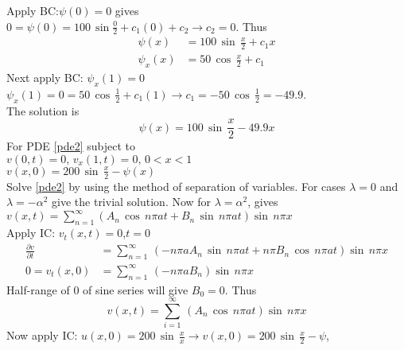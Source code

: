 Apply BC:$\psi(0)=0$ gives\\
$0=\psi(0)=100\,\sin\frac{0}{2}+c_1(0)+c_2\to c_2=0$. Thus
\begin{align}
\psi(x)&=100\,\sin\,\frac{x}{2}+c_1x\label{psi2}\\
\psi_x(x)&=50\,\cos\,\frac{x}{2}+c_1\label{psi3}
\end{align}
Next apply BC:  $\psi_x(1)=0$\\
  $\psi_x(1)=0=50\,\cos\,\frac{1}{2}+c_1(1)\to c_1=-50\,\cos\,\frac{1}{2}=-49.9$.\\
The solution is
\begin{equation}
\psi(x)=100\,\sin\,\frac{x}{2}-49.9x
\end{equation}
For PDE \eqref{pde2} subject to\\
$v(0,t)=0,\,v_x(1,t)=0,\,0<x<1$\\
$v(x,0)=200\,\sin\,\frac{x}{2}-\psi(x)$\\
Solve \eqref{pde2} by using the method of separation of variables. For cases $\lambda=0$ and $\lambda=-\alpha^2$ give the trivial solution. Now for $\lambda=\alpha^2$, gives\\
$v(x,t)=\sum_{n=1}^\infty\left(A_n\,\cos\,n\pi a t+B_n\,\sin\,n\pi a t\right)\sin\,n\pi x\label{s2}$\\
Apply IC: $v_t(x,t)=0$,$t=0$
\begin{align*}
\frac{\partial v}{\partial t}&=\sum_{n=1}^\infty\,(-n\pi aA_n\,\sin\,n\pi at+n\pi B_n\,\cos\,n\pi at)\sin\,n\pi x\\
0=v_t(x,0)&=\sum_{n=1}^\infty\,(-n\pi aB_n)\sin\,n\pi x
\end{align*}
Half-range of 0 of sine series will give $B_0=0$. Thus
\begin{equation}
v(x,t)=\sum_{i=1}^\infty\,(A_n\,\cos\,n\pi at)\sin\,n\pi x
\end{equation}
Now apply IC: $u(x,0)=200\,\sin\,\frac{x}{x}\to v(x,0)=200\,\sin\,\frac{x}{2}-\psi$,

